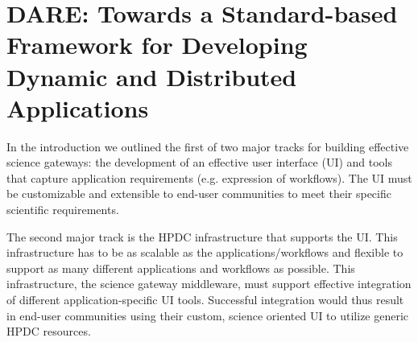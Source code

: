 \documentclass[]{svjour3}
\begin{document}








\section{DARE: Towards a Standard-based Framework for Developing
  Dynamic and Distributed Applications}

  In the introduction we outlined the first of two major tracks for building
  effective science gateways: the development of an effective user interface (UI)
  and tools that capture application requirements (e.g. expression of workflows).
  The UI must be customizable and extensible to end-user communities to meet their
  specific scientific requirements.
  
  The second major track is the HPDC infrastructure that supports the UI. This
  infrastructure has to be as scalable as the applications/workflows and flexible
  to support as many different applications and workflows as possible. This infrastructure,
  the science gateway middleware, must support effective integration of different
  application-specific UI tools. Successful integration would thus result in
  end-user communities using their custom, science oriented UI to utilize generic
  HPDC resources.
  
\end{document}
